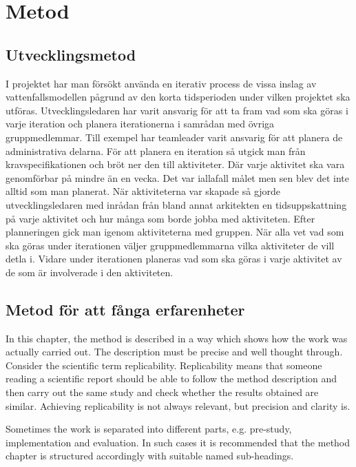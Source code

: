 \chapter{Metod}
\label{cha:method}

\section{Utvecklingsmetod}
I projektet har man försökt använda en iterativ process de vissa inslag av vattenfallsmodellen pågrund av den korta tidsperioden under vilken projektet ska utföras. Utvecklingsledaren har varit ansvarig för att ta fram vad som ska göras i varje iteration och planera iterationerna i samrådan med övriga gruppmedlemmar. Till exempel har teamleader varit ansvarig för att planera de administrativa delarna. För att planera en iteration så utgick man från kravspecifikationen och bröt ner den till aktiviteter. Där varje aktivitet ska vara genomförbar på mindre än en vecka. Det var iallafall målet men sen blev det inte alltid som man planerat. När aktiviteterna var skapade så gjorde utvecklingsledaren med inrådan från bland annat arkitekten en tidsuppskattning på varje aktivitet och hur många som borde jobba med aktiviteten. Efter planneringen gick man igenom aktiviteterna med gruppen. När alla vet vad som ska göras under iterationen väljer gruppmedlemmarna vilka aktiviteter de vill detla i. Vidare under iterationen planeras vad som ska göras i varje aktivitet av de som är involverade i den aktiviteten.

\section{Metod för att fånga erfarenheter}

In this chapter, the method is described in a way which shows how the
work was actually carried out. The description must be precise and
well thought through. Consider the scientific term
replicability. Replicability means that someone reading a scientific
report should be able to follow the method description and then carry
out the same study and check whether the results obtained are
similar. Achieving replicability is not always relevant, but precision
and clarity is.

Sometimes the work is separated into different parts, e.g.  pre-study,
implementation and evaluation. In such cases it is recommended that
the method chapter is structured accordingly with suitable named
sub-headings.

